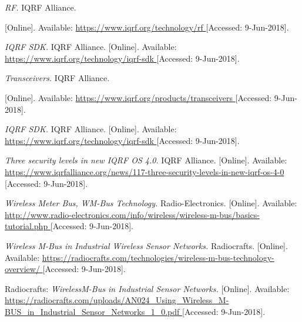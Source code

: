 

\begin{thebibliography}{9}

\textit{
RF.
}
IQRF Alliance.

[Online]. Available:
\url{
https://www.iqrf.org/technology/rf
}
[Accessed: 9-Jun-2018].


\textit{
IQRF SDK.
}
IQRF Alliance.
[Online]. Available:
\url{
https://www.iqrf.org/technology/iqrf-sdk
}
[Accessed: 9-Jun-2018].



\textit{
Transceivers.
}
IQRF Alliance.

[Online]. Available:
\url{
https://www.iqrf.org/products/transceivers
}
[Accessed: 9-Jun-2018].


\textit{
IQRF SDK.
}
IQRF Alliance.
[Online]. Available:
\url{
https://www.iqrf.org/technology/iqrf-sdk
}
[Accessed: 9-Jun-2018].


\textit{
Three security levels in new IQRF OS 4.0.
}
IQRF Alliance.
[Online]. Available:
\url{
https://www.iqrfalliance.org/news/117-three-security-levels-in-new-iqrf-os-4-0
}
[Accessed: 9-Jun-2018].


\textit{
Wireless Meter Bus, WM-Bus Technology.
}
Radio-Electronics.
[Online]. Available:
\url{
http://www.radio-electronics.com/info/wireless/wireless-m-bus/basics-tutorial.php
}
[Accessed: 9-Jun-2018].


\textit{
Wireless M-Bus in Industrial Wireless Sensor Networks.
}
Radiocrafts.
[Online]. Available:
\url{
https://radiocrafts.com/technologies/wireless-m-bus-technology-overview/
}
[Accessed: 9-Jun-2018].



Radiocrafts: 
\textit{
WirelessM-Bus in Industrial Sensor Networks.
}
[Online]. Available:
\url{
https://radiocrafts.com/uploads/AN024_Using_Wireless_M-BUS_in_Industrial_Sensor_Networks_1_0.pdf
}
[Accessed: 9-Jun-2018].



\end{thebibliography}
